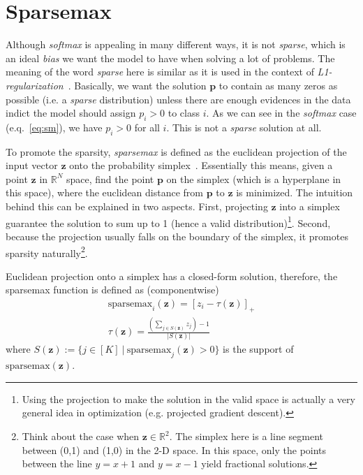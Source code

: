 \documentclass[11pt]{article}
\begin{document}
\section{Sparsemax}
Although \textit{softmax} is appealing in many different ways, it is not \textit{sparse}, which is an ideal \textit{bias} we want the model to have when solving a lot of problems. The meaning of the word \textit{sparse} here is similar as it is used in the context of \textit{L1-regularization}~\cite{tibshirani1996regression}. Basically, we want the solution $\boldsymbol{p}$ to contain as many zeros as possible (i.e. a \textit{sparse} distribution) unless there are enough evidences in the data indict the model should assign $p_i > 0$ to class $i$. As we can see in the \textit{softmax} case (e.q.~\ref{eq:sm}), we have $p_i > 0$ for all $i$. This is not a \textit{sparse} solution at all.

To promote the sparsity, \textit{sparsemax} is defined as the euclidean projection of the input vector $\boldsymbol{z}$ onto the probability simplex~\cite{martins2016from}. Essentially this means, given a point $\boldsymbol{z}$ in $\mathbb{R}^N$ space, find the point $\boldsymbol{p}$ on the simplex (which is a hyperplane in this space), where the euclidean distance from $\boldsymbol{p}$ to $\boldsymbol{z}$ is minimized. The intuition behind this can be explained in two aspects. First, projecting $\boldsymbol{z}$ into a simplex guarantee the solution to sum up to 1 (hence a valid distribution)\footnote{Using the projection to make the solution in the valid space is actually a very general idea in optimization (e.g. projected gradient descent).}. Second, because the projection usually falls on the boundary of the simplex, it promotes sparsity naturally\footnote{Think about the case when $\boldsymbol{z} \in \mathbb{R}^2$. The simplex here is a line segment between (0,1) and (1,0) in the 2-D space. In this space, only the points between the line $y = x + 1$ and $y = x - 1$ yield fractional solutions.}.

Euclidean projection onto a simplex has a closed-form solution, therefore, the sparsemax function is defined as (componentwise)
\begin{align}
\text{sparsemax}_{i}(\boldsymbol{z}) = [z_{i} - \tau(\boldsymbol{z})]_{+}\\
\tau(\boldsymbol{z}) = \frac{(\sum_{j \in S(\boldsymbol{z})} z_j)-1}{|S(\boldsymbol{z})|} \label{eq:spm}
\end{align}
where $S(\boldsymbol{z}) := \{j \in [K]~|~\text{sparsemax}_{j} (\boldsymbol{z}) > 0\}$ is the support of $\text{sparsemax}(\boldsymbol{z})$.
\end{document}

